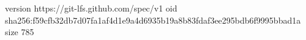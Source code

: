 version https://git-lfs.github.com/spec/v1
oid sha256:f59cfb32db7d07fa1af4d1e9a4d6935b19a8b83fdaf3ee295bdb6f9995bbad1a
size 785
